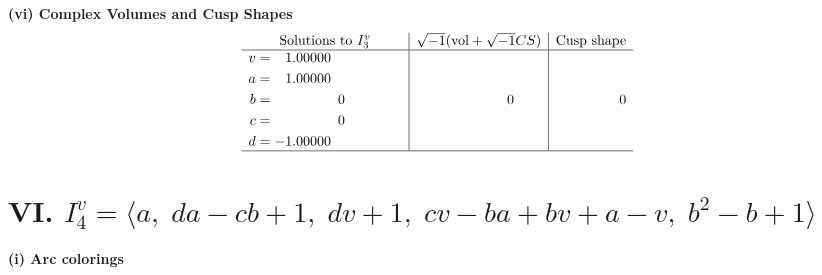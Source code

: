 \documentclass[1p]{elsarticle_modified}
\theoremstyle{definition}
\newcommand{\I}{\sqrt{-1}}
\begin{document}
\newpage\flushleft \textbf{(vi) Complex Volumes and Cusp Shapes}
$$\begin{array}{c|c|c}  
\text{Solutions to }I^v_{3}& \I (\text{vol} + \sqrt{-1}CS) & \text{Cusp shape}\\
 \hline 
\begin{aligned}
v &= \phantom{-}1.00000\phantom{ +0.000000I} \\
a &= \phantom{-}1.00000\phantom{ +0.000000I} \\
b &= \phantom{-0.000000 } 0 \\
c &= \phantom{-0.000000 } 0 \\
d &= -1.00000\phantom{ +0.000000I}\end{aligned}
 & \phantom{-0.000000 } 0 & \phantom{-0.000000 } 0\\
 \hline 
 \end{array}$$\newpage\newpage\renewcommand{\arraystretch}{1}
\centering \section*{VI. $I^v_{4}= \langle a,\;d a- c b+1,\;d v+1,\;c v- b a+b v+a- v,\;b^2- b+1 \rangle$}
\flushleft \textbf{(i) Arc colorings}\\
\end{document}

